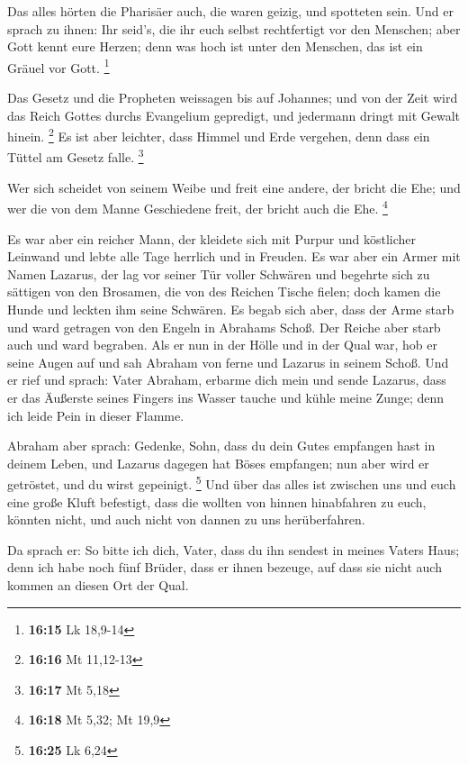  Das alles hörten die Pharisäer auch, die waren geizig,
und spotteten sein.  Und er sprach zu ihnen: Ihr seid's,
die ihr euch selbst rechtfertigt vor den Menschen; aber Gott kennt eure
Herzen; denn was hoch ist unter den Menschen, das ist ein Gräuel vor
Gott. \footnote{\textbf{16:15} Lk 18,9-14}

 Das Gesetz und die Propheten weissagen bis auf Johannes;
und von der Zeit wird das Reich Gottes durchs Evangelium gepredigt, und
jedermann dringt mit Gewalt hinein. \footnote{\textbf{16:16} Mt 11,12-13}
 Es ist aber leichter, dass Himmel und Erde vergehen,
denn dass ein Tüttel am Gesetz falle. \footnote{\textbf{16:17} Mt 5,18}

 Wer sich scheidet von seinem Weibe und freit eine
andere, der bricht die Ehe; und wer die von dem Manne Geschiedene freit,
der bricht auch die Ehe. \footnote{\textbf{16:18} Mt 5,32; Mt 19,9}

 Es war aber ein reicher Mann, der kleidete sich mit
Purpur und köstlicher Leinwand und lebte alle Tage herrlich und in
Freuden.  Es war aber ein Armer mit Namen Lazarus, der
lag vor seiner Tür voller Schwären  und begehrte sich zu
sättigen von den Brosamen, die von des Reichen Tische fielen; doch kamen
die Hunde und leckten ihm seine Schwären.  Es begab sich
aber, dass der Arme starb und ward getragen von den Engeln in Abrahams
Schoß. Der Reiche aber starb auch und ward begraben.  Als
er nun in der Hölle und in der Qual war, hob er seine Augen auf und sah
Abraham von ferne und Lazarus in seinem Schoß.  Und er
rief und sprach: Vater Abraham, erbarme dich mein und sende Lazarus,
dass er das Äußerste seines Fingers ins Wasser tauche und kühle meine
Zunge; denn ich leide Pein in dieser Flamme.

 Abraham aber sprach: Gedenke, Sohn, dass du dein Gutes
empfangen hast in deinem Leben, und Lazarus dagegen hat Böses empfangen;
nun aber wird er getröstet, und du wirst gepeinigt. \footnote{\textbf{16:25}
  Lk 6,24}  Und über das alles ist zwischen uns und euch
eine große Kluft befestigt, dass die wollten von hinnen hinabfahren zu
euch, könnten nicht, und auch nicht von dannen zu uns herüberfahren.

 Da sprach er: So bitte ich dich, Vater, dass du ihn
sendest in meines Vaters Haus;  denn ich habe noch fünf
Brüder, dass er ihnen bezeuge, auf dass sie nicht auch kommen an diesen
Ort der Qual.

